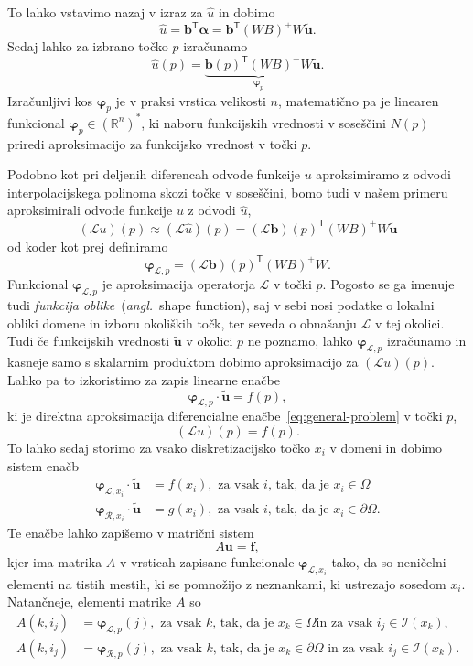 \documentclass[12pt,a4paper,twoside]{article}
\theoremstyle{definition} %
\theoremstyle{plain} %
\numberwithin{equation}{section}
\newcommand{\R}{\mathbb R}
\newcommand{\Rc}{\mathcal{R}}
\newcommand{\I}{\mathcal{I}}
\renewcommand{\L}{\mathcal{L}}
\newcommand{\T}{\mathsf{T}}
\renewcommand{\b}{\boldsymbol}
\renewcommand{\phi}{\varphi}
\newcommand{\uh}{\hat{u}}
\newcommand{\ang}[1]{(\textit{angl.}\ #1)}
\begin{document}
To lahko vstavimo nazaj v izraz za $\hat{u}$ in dobimo
\[
  \hat{u} = \b{b}^\T\b{\alpha} = \b{b}^\T(WB)^{+}W\b{\tilde{u}}.
\]
Sedaj lahko za izbrano točko $p$ izračunamo
\[
  \hat{u}(p) = \underbrace{\b{b}(p)^\T(WB)^{+}W}_{\b\phi_p}\b{\tilde{u}}.
\]
Izračunljivi kos $\b\phi_p$ je v praksi vrstica velikosti $n$, matematično pa je
linearen funkcional $\b\phi_p \in (\R^n)^\ast$, ki naboru funkcijskih vrednosti v
soseščini $N(p)$ priredi aproksimacijo za funkcijsko vrednost v točki $p$.

Podobno kot pri deljenih diferencah odvode funkcije $u$ aproksimiramo z odvodi
interpolacijskega polinoma skozi točke v soseščini, bomo tudi v našem primeru
aproksimirali odvode funkcije $u$ z odvodi $\uh$,
\[
  (\L u)(p) \approx (\L \uh)(p) = (\L\b{b})(p)^\T(WB)^{+}W \b{\tilde{u}}
\]
od koder kot prej definiramo
\begin{equation}
  \b\phi_{\L,p} = (\L\b{b})(p)^\T(WB)^{+}W.
  \label{eq:shape-definition}
\end{equation}
Funkcional $\b\phi_{\L,p}$ je aproksimacija operatorja $\L$ v točki $p$.
Pogosto se ga imenuje tudi \emph{funkcija oblike}~\ang{shape function}, saj v
sebi nosi podatke o lokalni obliki domene in izboru okoliških točk, ter seveda o
obnašanju $\L$ v tej okolici. Tudi če funkcijskih vrednosti $\b{\tilde{u}}$ v
okolici $p$ ne poznamo, lahko $\b\phi_{\L, p}$ izračunamo in kasneje samo s
skalarnim produktom dobimo aproksimacijo za $(\L u)(p)$. Lahko pa to izkoristimo
za zapis linearne enačbe
\[
  \b\phi_{\L,p} \cdot \b{\tilde{u}} = f(p),
\]
ki je direktna aproksimacija diferencialne enačbe~\eqref{eq:general-problem} v točki
$p$,
\[
  (\L u)(p) = f(p).
\]
To lahko sedaj storimo za vsako diskretizacijsko točko $x_i$ v domeni in
dobimo sistem enačb
\begin{align*}
  \b\phi_{\L,x_i} \cdot \b{\tilde{u}} &= f(x_i), \text{ za vsak $i$, tak, da je $x_i \in \Omega$ } \\
  \b\phi_{\Rc,x_i} \cdot \b{\tilde{u}} &= g(x_i), \text{ za vsak $i$, tak, da je $x_i \in \partial\Omega$.}
\end{align*}
Te enačbe lahko zapišemo v matrični sistem
\begin{equation}
  A\b{u} = \b{f},
  \label{eq:discretized-system}
\end{equation}
kjer ima matrika $A$ v vrsticah zapisane funkcionale $\b\phi_{\L,x_i}$ tako, da so
neničelni elementi na tistih mestih, ki se pomnožijo z neznankami, ki ustrezajo
sosedom $x_i$. Natančneje, elementi matrike $A$ so
\begin{align*}
  A(k, i_j) &= \b\phi_{\L,p}(j), \text{ za vsak $k$, tak, da je $x_k \in \Omega$
  in za vsak $i_j \in \I(x_k)$,} \\
  A(k, i_j) &= \b\phi_{\Rc,p}(j), \text{ za vsak $k$, tak, da je $x_k \in
  \partial\Omega$ in za vsak $i_j \in \I(x_k)$.}
\end{align*}
\end{document}

